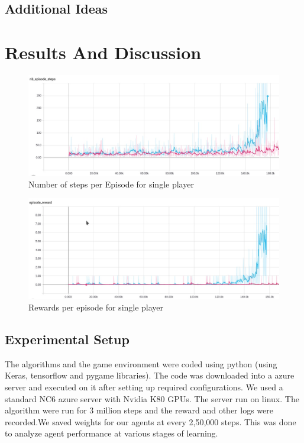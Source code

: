 \documentclass[conference,10pt]{IEEEtran}
\begin{document}
	\subsection{Additional Ideas}
	
	
	\section{Results And Discussion}
	\begin{figure}[]

		\includegraphics[width=\linewidth]{ep_step.jpeg}
		\caption{Number of steps per Episode for single player}
		\label{step}

	\end{figure}
	\begin{figure}[]

		\includegraphics[width = \linewidth]{ep_reward.jpeg}
		\caption{Rewards per episode for single player}
		\label{reward}

	\end{figure}
	\subsection{Experimental Setup}
	The algorithms and the game environment were coded using python (using Keras, tensorflow and pygame libraries). The code was downloaded into a azure server and executed on it after setting up required configurations. We used a standard NC6 azure server with Nvidia K80 GPUs. The server run on linux. 
	\break
	\break
	The algorithm were run for 3 million steps and the reward and other logs were recorded.We saved weights for our agents at every 2,50,000 steps. This was done to analyze agent performance at various stages of learning.
\end{document}

